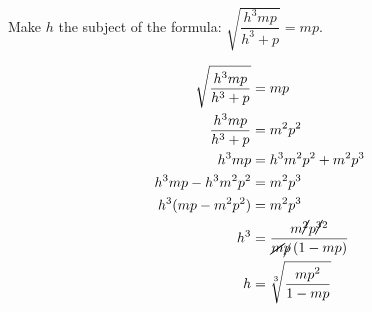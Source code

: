 \documentclass[11pt, answers, addpoints]{exam}
\renewcommand{\frac}[2]{\dfrac{#1}{#2}}
\begin{document}
\begin{questions}
	\question[4] Make \(h\) the subject of the formula: \(\sqrt{\frac{h^{3}mp}{h^{3} + p}} = mp\).
	\begin{solution}
		\begin{align*}
			\sqrt{\frac{h^{3}mp}{h^{3} + p}} & = mp                                                                               \\
			\frac{h^{3}mp}{h^{3} + p}        & = m^{2}p^{2}                                                                       \\
			h^{3}mp                          & = h^{3}m^{2}p^{2} + m^{2}p^{3}                                                     \\
			h^{3}mp - h^{3}m^{2}p^{2}        & = m^{2}p^{3}                                                                       \\
			h^{3}(mp - m^{2}p^{2})           & = m^{2}p^{3}                                                                       \\
			h^{3}                            & = \frac{m\cancel{^{2}}p\cancel{^{3}}^{2}}{\cancel{m}\cancel{p}\left(1 - mp\right)} \\
			h                                & = \sqrt[3]{\frac{mp^{2}}{1 - mp}}
		\end{align*}
	\end{solution}

	\question%
\end{questions}
\end{document}
